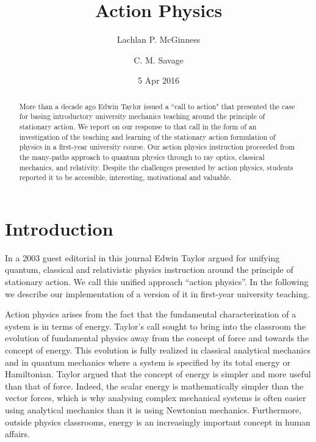 \documentclass[prb,oncolumn]{revtex4-2}
\begin{document}
\title{Action Physics}

\author{Lachlan P. McGinness}
\author{C. M. Savage}

\date{5 Apr 2016 }


\begin{abstract}
\medskip
\medskip
More than a decade ago Edwin Taylor issued a ``call to action" that presented the case for basing introductory university mechanics teaching around the principle of stationary action. \cite{Taylor2003} We report on our response to that call in the form of an investigation of the teaching and learning of the stationary action formulation of physics in a first-year university course.  Our action physics instruction proceeded from the many-paths approach to quantum physics through to ray optics, classical mechanics, and relativity. Despite the challenges presented by action physics, students reported it to be accessible, interesting, motivational and valuable. 
\end{abstract}

\maketitle
\newpage

\section{Introduction}
\label{Introduction}
In a 2003 guest editorial in this journal Edwin Taylor argued for unifying quantum, classical and relativistic physics instruction around the principle of stationary action. \cite{Taylor2003} We call this unified approach ``action physics''. In the following we describe our implementation of a version of it in first-year university teaching.

Action physics arises from the fact that the fundamental characterization of a system is in terms of energy. Taylor's call sought to bring into the classroom the evolution of fundamental physics away from the concept of force and towards the concept of energy. \cite{Jammer,Lanczos}  This evolution is fully realized in classical analytical mechanics and in quantum mechanics where a system is specified by its total energy or Hamiltonian. Taylor argued that the concept of energy is simpler and more useful than that of force. Indeed, the scalar energy is mathematically simpler than the vector forces, which is why analysing complex mechanical systems is often easier using analytical mechanics than it is using Newtonian mechanics. Furthermore, outside physics classrooms, energy is an increasingly important concept in human affairs.
\end{document}
